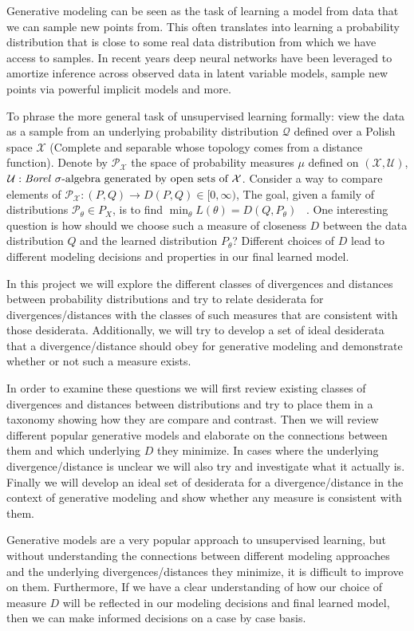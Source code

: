 Generative modeling can be seen as the task of learning a model from data that we can sample new points from. This often translates into learning a probability distribution that is close to some real data distribution from which we have access to samples. In recent years deep neural networks have been leveraged to amortize inference across observed data in latent variable models, sample new points via powerful implicit models and more. 

To phrase the more general task of unsupervised learning formally: view the data as a sample from an underlying probability distribution $\mathcal{Q}$ defined over a Polish space $\mathcal{X}$ (Complete and separable whose topology comes from a distance function). Denote by $\mathcal{P}_{\mathcal{X}}$ the space of probability measures $\mu$ defined on $(\mathcal{X},\mathcal{U})$, $\mathcal{U}:\text{\textit{Borel} $\sigma$-algebra generated by open sets of $\mathcal{X}$}$. Consider a way to compare elements of $\mathcal{P}_{\mathcal{X}}: (P,Q) \rightarrow D(P,Q) \in [0, \infty)$, The goal, given a family of distributions $\mathcal{P}_\theta \in P_X$, is to find $\min_{\theta}L(\theta)=D(Q, P_{\theta})$ ~\cite{1712.07822}. One interesting question is how should we choose such a  measure of closeness $D$ between the data distribution $Q$ and the learned distribution $P_\theta$? Different choices of $D$ lead to different modeling decisions and properties in our final learned model.

In this project we will explore the different classes of divergences and distances between probability distributions and try to relate desiderata for divergences/distances with the classes of such measures that are consistent with those desiderata. Additionally, we will try to develop a set of ideal desiderata that a divergence/distance should  obey for generative modeling and demonstrate whether or not such a measure exists.

In order to examine these questions we will first review existing classes of divergences and distances between distributions and try to place them in a taxonomy showing how they are compare and contrast. Then we will review different popular generative models and elaborate on the connections between them and which underlying $D$ they minimize. In cases where the underlying divergence/distance is unclear we will also try and investigate what it actually is. Finally we will develop an ideal set of desiderata for a divergence/distance in the context of generative modeling and show whether any measure is consistent with them.

Generative models are a very popular approach to unsupervised learning, but without understanding the connections between different modeling approaches and the underlying divergences/distances they minimize, it is difficult to improve on them. Furthermore, If we have a clear understanding of how our choice of measure $D$ will be reflected in our modeling decisions and final learned model, then we can make informed decisions on a case by case basis.